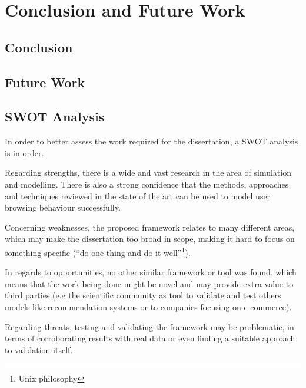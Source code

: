\chapter{Conclusion and Future Work} \label{chap:conclusion}

\section*{}



\section{Conclusion}

\section{Future Work}

\section{SWOT Analysis}

In order to better assess the work required for the dissertation, a SWOT 
analysis is in order.

Regarding strengths, there is a wide and vast research in the area of 
simulation and modelling. There is also a strong confidence that the methods, 
approaches and techniques reviewed in the state of the art can be used to model 
user browsing behaviour successfully.

Concerning weaknesses, the proposed framework relates to many different areas, 
which may make the dissertation too broad in scope, making it hard to focus on 
something specific (``do one thing and do it well''\footnote{Unix philosophy}).

In regards to opportunities, no other similar framework or tool was found, 
which means that the work being done might be novel and may provide extra value 
to third parties (e.g the scientific community as tool to validate and test 
others models like recommendation systems or to companies focusing on 
e-commerce).

Regarding threats, testing and validating the framework may be problematic, in 
terms of corroborating results with real data or even finding a suitable 
approach to validation itself.
